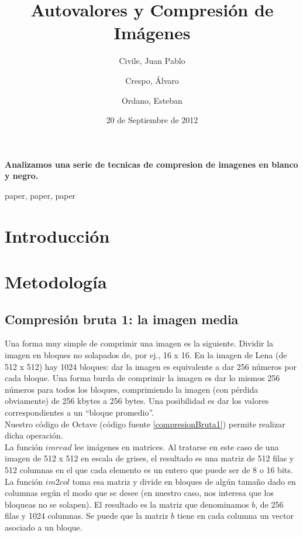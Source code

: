 \documentclass[twocolumn,a4paper,10pt]{article}
\title{Autovalores y Compresión de Imágenes}
\date{20 de Septiembre de 2012}
\author{Civile, Juan Pablo \and Crespo, Álvaro \and Ordano, Esteban }
\begin{document}
\pagestyle{fancy}
\maketitle
\thispagestyle{fancy}

\begin{customabstract}
\textbf{
    Analizamos una serie de tecnicas de compresion de imagenes en blanco y negro.
}
\end{customabstract}

\begin{keywords}
paper, paper, paper
\end{keywords}


\section{Introducci\'on}

\section{Metodología}

\subsection{Compresi\'on bruta 1: la imagen media}

Una forma muy simple de comprimir una imagen es la siguiente. Dividir la imagen en bloques no solapados de, por ej., 16 x 16. En la imagen de Lena (de 512 x 512) 
hay 1024 bloques: dar la imagen es equivalente a dar 256 n\'umeros por cada bloque. Una forma burda de comprimir la imagen es dar lo mismos 256 n\'umeros para todos 
los bloques, comprimiendo la imagen (con p\'erdida obviamente) de 256 kbytes a 256 bytes. Una posibilidad es dar los valores correspondientes a un ``bloque promedio''.\\

Nuestro c\'odigo de Octave (c\'odigo fuente \ref{compresionBruta1}) permite realizar dicha operaci\'on. \\

La funci\'on $imread$ lee im\'agenes en matrices. Al tratarse en este caso de una imagen de 512 x 512 en escala de grises, el resultado es una matriz de 512 filas y 
512 columnas en el que cada elemento es un entero que puede ser de 8 o 16 bits. La funci\'on $im2col$ toma esa matriz y divide en bloques de alg\'un tamaño dado en 
columnas seg\'un el modo que se desee (en nuestro caso, nos interesa que los bloqueas no se solapen). El resultado es la matriz que denominamos $b$, de 256 filas y 
1024 columnas. Se puede que la matriz $b$ tiene en cada columna un vector asociado a un bloque.  \\
\end{document}
